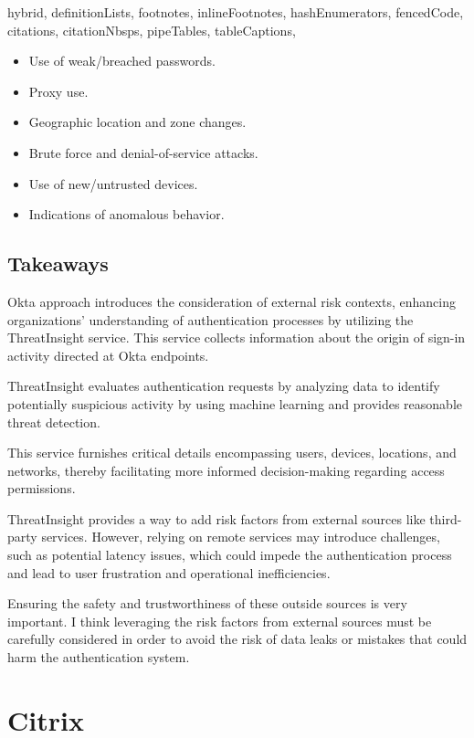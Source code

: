 \documentclass[
  digital,     %
  oneside,     %
  nosansbold,  %
  nocolorbold, %
  lof,         %
  lot,         %
]{fithesis4}
\begin{document}
\begin{markdown*}{%
  hybrid,
  definitionLists,
  footnotes,
  inlineFootnotes,
  hashEnumerators,
  fencedCode,
  citations,
  citationNbsps,
  pipeTables,
  tableCaptions,
}

\begin{itemize}
    \item Use of weak/breached passwords.
    \item Proxy use.
    \item Geographic location and zone changes.
    \item Brute force and denial-of-service attacks.
    \item Use of new/untrusted devices.
    \item Indications of anomalous behavior. 
\end{itemize}

\newpage
\subsection{Takeaways}
Okta approach introduces the consideration of external risk contexts, enhancing organizations' understanding of authentication processes by utilizing the ThreatInsight service.
This service collects information about the origin of sign-in activity directed at Okta endpoints.

ThreatInsight evaluates authentication requests by analyzing data to identify potentially suspicious activity by using machine learning and provides reasonable threat detection. 

This service furnishes critical details encompassing users, devices, locations, and networks, thereby facilitating more informed decision-making regarding access permissions.

ThreatInsight provides a way to add risk factors from external sources like third-party services. However, relying on remote services may introduce challenges, such as potential latency issues, which could impede the authentication process and lead to user frustration and operational inefficiencies.\cite{existing-okta-lowrisk} \cite{existing-okta-confidence}

Ensuring the safety and trustworthiness of these outside sources is very important.
I think leveraging the risk factors from external sources must be carefully considered in order to avoid the risk of data leaks or mistakes that could harm the authentication system.

\newpage
\section{Citrix}


\end{markdown*}
\end{document}
